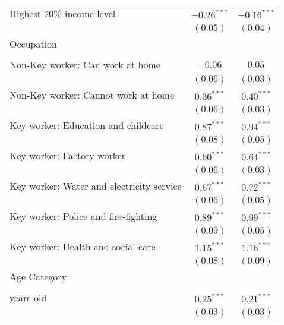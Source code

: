 \begin{table}
\begin{center}
\begin{scriptsize}
\begin{tabular}{l c c}
\quad Highest 20\% income level                 & $-0.26^{***}$ & $-0.16^{***}$ \\
                                                & $(0.05)$      & $(0.04)$      \\
Occupation                                      &               &               \\
                                                &               &               \\
\quad Non-Key worker: Can work at home          & $-0.06$       & $0.05$        \\
                                                & $(0.06)$      & $(0.03)$      \\
\quad Non-Key worker: Cannot work at home       & $0.36^{***}$  & $0.40^{***}$  \\
                                                & $(0.06)$      & $(0.03)$      \\
\quad Key worker: Education and childcare       & $0.87^{***}$  & $0.94^{***}$  \\
                                                & $(0.08)$      & $(0.05)$      \\
\quad Key worker: Factory worker                & $0.60^{***}$  & $0.64^{***}$  \\
                                                & $(0.06)$      & $(0.03)$      \\
\quad Key worker: Water and electricity service & $0.67^{***}$  & $0.72^{***}$  \\
                                                & $(0.06)$      & $(0.05)$      \\
\quad Key worker: Police and fire-fighting      & $0.89^{***}$  & $0.99^{***}$  \\
                                                & $(0.09)$      & $(0.05)$      \\
\quad Key worker: Health and social care        & $1.15^{***}$  & $1.16^{***}$  \\
                                                & $(0.08)$      & $(0.09)$      \\
Age Category                                    &               &               \\
                                                &               &               \\
\quad 40 years old                              & $0.25^{***}$  & $0.21^{***}$  \\
                                                & $(0.03)$      & $(0.03)$      \\

\end{tabular}
\end{scriptsize}
\end{center}
\end{table}
